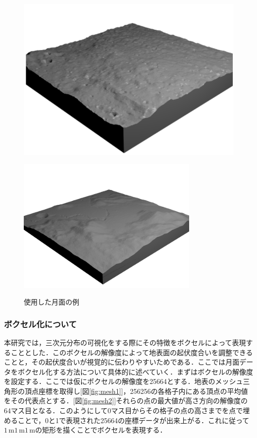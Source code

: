 \documentclass[twocolumn]{jarticle} %
\begin{document}
\begin{figure}[htbp]
  \centering
  \begin{minipage}[b]{0.48\linewidth}
    \centering
    \includegraphics[keepaspectratio, scale=0.3]{images/NASA_moon.png}
    \label{fig:NASA_moon}
  \end{minipage}
  \begin{minipage}[b]{0.48\linewidth}
    \centering
    \includegraphics[keepaspectratio, scale=0.6]{images/NASA_moon2.png}
    \label{fig:NASA_moon2}
  \end{minipage}
  \caption{使用した月面の例}\label{fig:NASA_moons}
\end{figure}



\subsubsection{ボクセル化について}
本研究では，三次元分布の可視化をする際にその特徴をボクセルによって表現することとした．このボクセルの解像度によって地表面の起伏度合いを調整できることと，その起伏度合いが視覚的に伝わりやすいためである．ここでは月面データをボクセル化する方法について具体的に述べていく．まずはボクセルの解像度を設定する．ここでは仮にボクセルの解像度を256\times64とする．地表のメッシュ三角形の頂点座標を取得し[図\ref{fig:mesh1}]，256\times256の各格子内にある頂点の平均値をその代表点とする．[図\ref{fig:mesh2}]それらの点の最大値が高さ方向の解像度の64マス目となる．このようにして0マス目からその格子の点の高さまでを点で埋めることで，0と1で表現された256\times64の座標データが出来上がる．これに従って$1\mathrm{\,m}$\times$1\mathrm{\,m}$\times$1\mathrm{\,m}$の矩形を描くことでボクセルを表現する．
\end{document}
